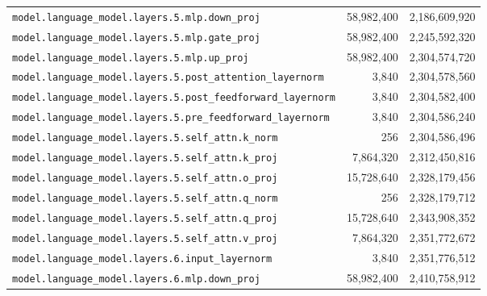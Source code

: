 \documentclass[10pt,a4paper]{article}
\theoremstyle{definition}
\begin{document}
\begin{appendices}
\begin{longtable}{p{9.5cm}rr}
\texttt{model.\allowbreak{}language\_model.\allowbreak{}layers.\allowbreak{}5.\allowbreak{}mlp.\allowbreak{}down\_proj} & 58,982,400 & 2,186,609,920 \\
\texttt{model.\allowbreak{}language\_model.\allowbreak{}layers.\allowbreak{}5.\allowbreak{}mlp.\allowbreak{}gate\_proj} & 58,982,400 & 2,245,592,320 \\
\texttt{model.\allowbreak{}language\_model.\allowbreak{}layers.\allowbreak{}5.\allowbreak{}mlp.\allowbreak{}up\_proj} & 58,982,400 & 2,304,574,720 \\
\texttt{model.\allowbreak{}language\_model.\allowbreak{}layers.\allowbreak{}5.\allowbreak{}post\_attention\_layernorm} & 3,840 & 2,304,578,560 \\
\texttt{model.\allowbreak{}language\_model.\allowbreak{}layers.\allowbreak{}5.\allowbreak{}post\_feedforward\_layernorm} & 3,840 & 2,304,582,400 \\
\texttt{model.\allowbreak{}language\_model.\allowbreak{}layers.\allowbreak{}5.\allowbreak{}pre\_feedforward\_layernorm} & 3,840 & 2,304,586,240 \\
\texttt{model.\allowbreak{}language\_model.\allowbreak{}layers.\allowbreak{}5.\allowbreak{}self\_attn.\allowbreak{}k\_norm} & 256 & 2,304,586,496 \\
\texttt{model.\allowbreak{}language\_model.\allowbreak{}layers.\allowbreak{}5.\allowbreak{}self\_attn.\allowbreak{}k\_proj} & 7,864,320 & 2,312,450,816 \\
\texttt{model.\allowbreak{}language\_model.\allowbreak{}layers.\allowbreak{}5.\allowbreak{}self\_attn.\allowbreak{}o\_proj} & 15,728,640 & 2,328,179,456 \\
\texttt{model.\allowbreak{}language\_model.\allowbreak{}layers.\allowbreak{}5.\allowbreak{}self\_attn.\allowbreak{}q\_norm} & 256 & 2,328,179,712 \\
\texttt{model.\allowbreak{}language\_model.\allowbreak{}layers.\allowbreak{}5.\allowbreak{}self\_attn.\allowbreak{}q\_proj} & 15,728,640 & 2,343,908,352 \\
\texttt{model.\allowbreak{}language\_model.\allowbreak{}layers.\allowbreak{}5.\allowbreak{}self\_attn.\allowbreak{}v\_proj} & 7,864,320 & 2,351,772,672 \\
\texttt{model.\allowbreak{}language\_model.\allowbreak{}layers.\allowbreak{}6.\allowbreak{}input\_layernorm} & 3,840 & 2,351,776,512 \\
\texttt{model.\allowbreak{}language\_model.\allowbreak{}layers.\allowbreak{}6.\allowbreak{}mlp.\allowbreak{}down\_proj} & 58,982,400 & 2,410,758,912 \\

\end{longtable}
\end{appendices}
\end{document}
